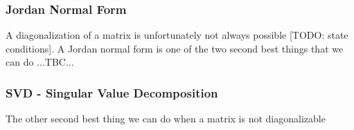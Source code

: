 







\subsubsection{Jordan Normal Form}
A diagonalization of a matrix is unfortunately not always possible [TODO: state conditions]. A Jordan normal form is one of the two second best things that we can do ...TBC...










\subsubsection{SVD - Singular Value Decomposition}

The other second best thing we can do when a matrix is not diagonalizable 


